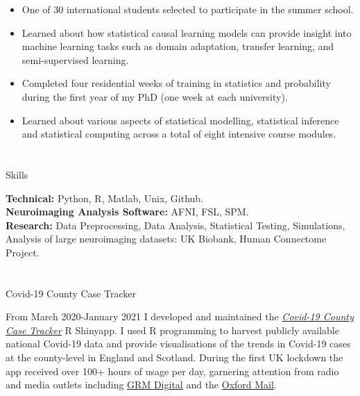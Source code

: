 \documentclass{my_cv}
\begin{document}
%
    {\begin{itemize}[topsep=0pt,itemsep=0pt,partopsep=0pt, parsep=0pt] 
    \item One of 30 international students selected to participate in the summer school. 
    \item Learned about how statistical causal learning models can provide insight into machine learning tasks such as domain adaptation, transfer learning, and semi-supervised learning. 
    \end{itemize}
    }%
     
%
    {\uline{ \hfill {}}}%
    {\begin{itemize}[topsep=0pt,itemsep=0pt,partopsep=0pt, parsep=0pt] 
    \item Completed four residential weeks of training in statistics and probability during the first year of my PhD (one week at each university).
    \item Learned about various aspects of statistical modelling, statistical inference and statistical computing across a total of eight intensive course modules.
    \end{itemize}
    }%

\section{\faGears}{Skills}

\textbf{Technical:} Python, R, Matlab, Unix, Github. \\
\textbf{Neuroimaging Analysis Software:} AFNI, FSL, SPM.  \\
\textbf{Research:} Data Preprocessing, Data Analysis, Statistical Testing, Simulations, Analysis of large neuroimaging datasets: UK Biobank, Human Connectome Project. \\

\section{\faLaptop}{Covid-19 County Case Tracker}

From March 2020-January 2021 I developed and maintained the \href{https://covid19cct.shinyapps.io/covid19cct/}{\textit{Covid-19 County Case Tracker}} R Shinyapp. I used R programming to harvest publicly available national Covid-19 data and provide visualisations of the trends in Covid-19 cases at the county-level in England and Scotland. During the first UK lockdown the app received over 100+ hours of usage per day, garnering attention from radio and media outlets including \href{https://grm.digital/heroes-of-covid19/info/}{GRM Digital} and the \href{https://www.oxfordmail.co.uk/news/18358052.app-tracks-oxfordshire-covid-19-cases/}{Oxford Mail}.
\end{document}
